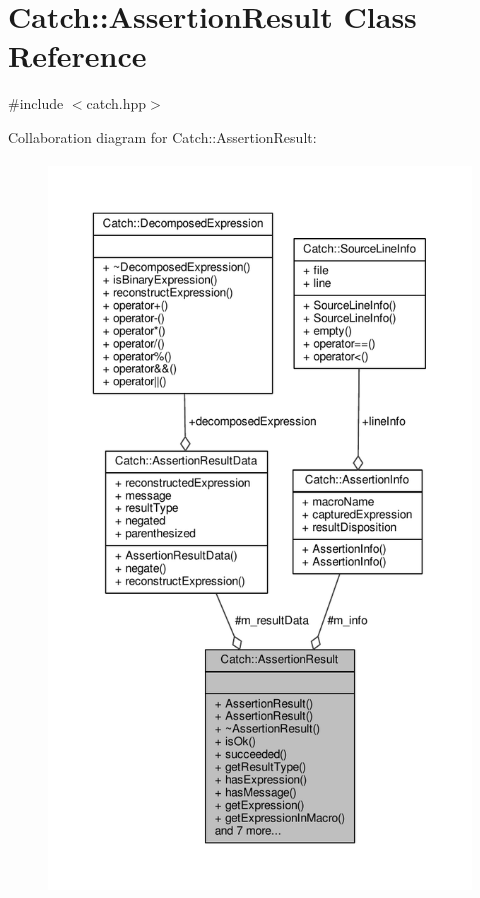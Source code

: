 \hypertarget{class_catch_1_1_assertion_result}{\section{Catch\-:\-:Assertion\-Result Class Reference}
\label{class_catch_1_1_assertion_result}
}


{\ttfamily \#include $<$catch.\-hpp$>$}



Collaboration diagram for Catch\-:\-:Assertion\-Result\-:
\nopagebreak
\begin{figure}[H]
\begin{center}
\leavevmode
\includegraphics[height=550pt]{class_catch_1_1_assertion_result__coll__graph}
\end{center}
\end{figure}
